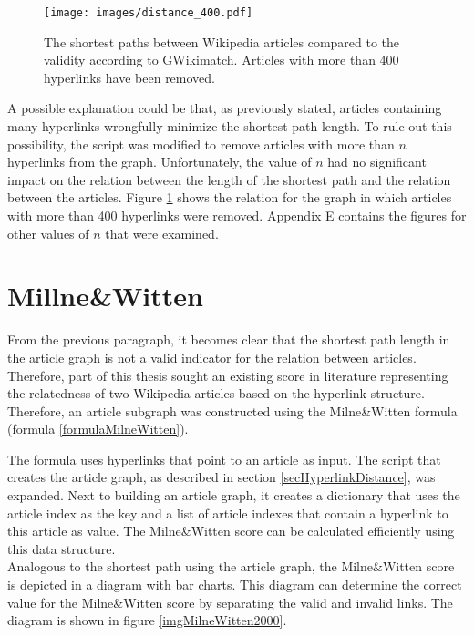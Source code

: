 \begin{figure}[h]
\centering
\captionsetup{justification=centering}
\texttt{[image: images/distance\_400.pdf]}
\caption{The shortest paths between Wikipedia articles compared to the validity according to GWikimatch. Articles with more than 400 hyperlinks have been removed. }
\label{imgDistance400}
\end{figure}

A possible explanation could be that, as previously stated, articles containing many hyperlinks wrongfully minimize the shortest path length. To rule out this possibility, the script was modified to remove articles with more than $n$ hyperlinks from the graph. Unfortunately, the value of $n$ had no significant impact on the relation between the length of the shortest path and the relation between the articles. Figure \ref{imgDistance400} shows the relation for the graph in which articles with more than 400 hyperlinks were removed. Appendix E contains the figures for other values of $n$ that were examined. 

\section{Millne\&Witten}
\label{secMilneWitten}
From the previous paragraph, it becomes clear that the shortest path length in the article graph is not a valid indicator for the relation between articles. Therefore, part of this thesis sought an existing score in literature representing the relatedness of two Wikipedia articles based on the hyperlink structure. Therefore, an article subgraph was constructed using the Milne\&Witten formula (formula \ref{formulaMilneWitten}).

The formula uses hyperlinks that point to an article as input. The script that creates the article graph, as described in section \ref{secHyperlinkDistance}, was expanded. Next to building an article graph, it creates a dictionary that uses the article index as the key and a list of article indexes that contain a hyperlink to this article as value. The Milne\&Witten score can be calculated efficiently using this data structure.\\

Analogous to the shortest path using the article graph, the Milne\&Witten score is depicted in a diagram with bar charts. This diagram can determine the correct value for the Milne\&Witten score by separating the valid and invalid links. The diagram is shown in figure \ref{imgMilneWitten2000}.\\

